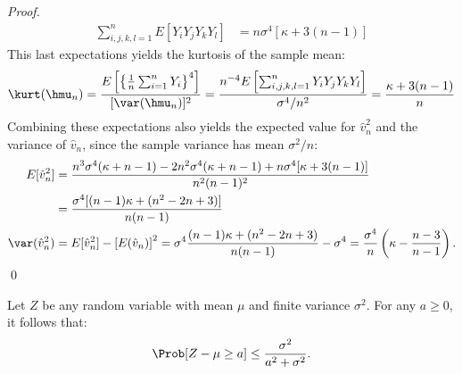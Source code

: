 \documentclass[graybox]{svmult}
\newcommand{\hv}{\hat{v}}
\begin{document}
\begin{proof}
\begin{align*}
\sum_{i,j,k,l=1}^n E[Y_iY_j Y_k Y_l] &= n\sigma^4[ \kappa + 3(n-1)]
\end{align*}
This last expectations yields the kurtosis of the sample mean:
\[
\kurt(\hmu_n) = \frac{E\left[ \left\{\frac{1}{n} \sum_{i=1}^n Y_i \right\}^4\right]}{[\var(\hmu_n)]^2} = \frac{n^{-4} E\left[ \sum_{i,j,k,l=1}^n Y_iY_j Y_k Y_l \right]}{\sigma^4/n^2} = \frac{\kappa + 3(n-1)}{n} 
\] 
Combining these expectations also yields the expected value for $\hv_n^2$ and the variance of $\hv_n$, since the sample variance has mean $\sigma^2/n$: 
\begin{align*}
E[\hv_n^2] & = \frac{ n^3\sigma^4 (\kappa + n-1)  - 2 n^2 \sigma^4(\kappa + n-1) +  n\sigma^4 [\kappa + 3(n-1)]} {n^2(n-1)^2} \\
& = \frac{\sigma^4[ (n-1)\kappa + (n^2-2n+3)]} {n(n-1)} \\
\var(\hv_n^2) & = E[\hv_n^2] - \left[E(\hv_n)\right]^2 = \sigma^4 \frac{ (n-1)\kappa + (n^2-2n+3)} {n(n-1)} -\sigma^4 = \frac{\sigma^4}{n} \left ( \kappa  - \frac{n-3}{n-1} \right).
\end{align*}
\hfill \hfill \qed
\end{proof}
\begin{theorem}\label{Can}
Let $Z$ be any random variable with mean $\mu$ and finite variance $\sigma^2$.  For any $a\geq 0$, it
follows that:
\[
\Prob[Z-\mu \geq a]\leq \frac{\sigma^2}{a^2+\sigma^2}.
\]
\end{theorem}
\end{document}
